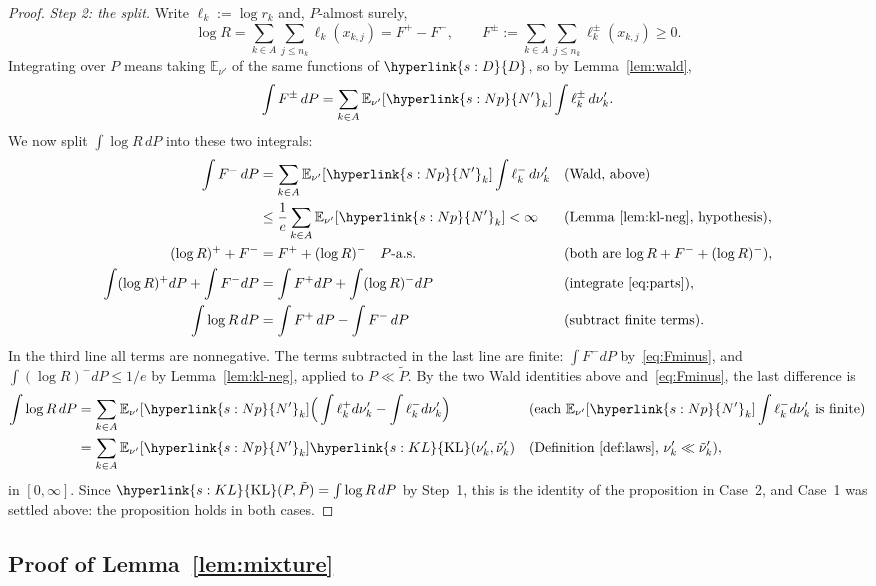 \documentclass[11pt]{article}
\newcommand{\sy}[2]{\hyperlink{#1}{#2}}
\newcommand{\E}{\mathbb{E}}
\newcommand{\KL}{\sy{s:KL}{\mathrm{KL}}}
\newcommand{\Np}{\sy{s:Np}{N'}}
\newcommand{\Dd}{\sy{s:D}{D}}
\begin{document}
\begin{proof}
\emph{Step 2: the split.} Write $\ell_k:=\log r_k$ and, $P$-almost surely,
\begin{equation*}
\log R=\sum_{k\in A}\sum_{j\le n_k}\ell_k(x_{k,j})=F^+-F^-,\qquad
F^\pm:=\sum_{k\in A}\sum_{j\le n_k}\ell_k^\pm(x_{k,j})\ge0.
\end{equation*}
Integrating over $P$ means taking $\E_{\nu'}$ of the same functions of $\Dd$, so by
Lemma~\ref{lem:wald},
\begin{equation*}
\int F^\pm\,dP=\sum_{k\in A}\E_{\nu'}[\Np_k]\int\ell_k^\pm\,d\nu'_k.
\end{equation*}
We now split $\int\log R\,dP$ into these two integrals:
\begin{align}
\int F^-\,dP&=\sum_{k\in A}\E_{\nu'}[\Np_k]\int\ell_k^-\,d\nu'_k
&&\text{(Wald, above)}\notag\\
&\le\frac1e\sum_{k\in A}\E_{\nu'}[\Np_k]<\infty
&&\text{(Lemma~\ref{lem:kl-neg}, hypothesis)},\label{eq:Fminus}\\
(\log R)^++F^-&=F^++(\log R)^-\quad P\text{-a.s.}
&&\text{(both are $\log R+F^-+(\log R)^-$)},\label{eq:parts}\\
\int(\log R)^+dP+\int F^-dP&=\int F^+dP+\int(\log R)^-dP
&&\text{(integrate~\eqref{eq:parts})},\notag\\
\int\log R\,dP&=\int F^+\,dP-\int F^-\,dP
&&\text{(subtract finite terms)}.\notag
\end{align}
In the third line all terms are nonnegative. The terms subtracted in the last line are finite:
$\int F^-dP$ by~\eqref{eq:Fminus}, and $\int(\log R)^-dP\le1/e$ by Lemma~\ref{lem:kl-neg}, applied
to $P\ll\tilde P$. By the two
Wald identities above and~\eqref{eq:Fminus}, the last difference is
\begin{align*}
\int\log R\,dP&=\sum_{k\in A}\E_{\nu'}[\Np_k]\Big(\int\ell_k^+d\nu'_k-\int\ell_k^-d\nu'_k\Big)
&&\text{(each $\E_{\nu'}[\Np_k]\int\ell_k^-d\nu'_k$ is finite)}\\
&=\sum_{k\in A}\E_{\nu'}[\Np_k]\KL(\nu'_k,\tilde\nu'_k)
&&\text{(Definition~\ref{def:laws}, $\nu'_k\ll\tilde\nu'_k$)},
\end{align*}
in $[0,\infty]$. Since $\KL(P,\tilde P)=\int\log R\,dP$ by Step~1, this is the identity of the
proposition in Case~2, and Case~1 was settled above: the proposition holds in both cases.
\end{proof}

\subsection{Proof of Lemma~\ref{lem:mixture}}\label{sec:proof-mixture}
\end{document}
